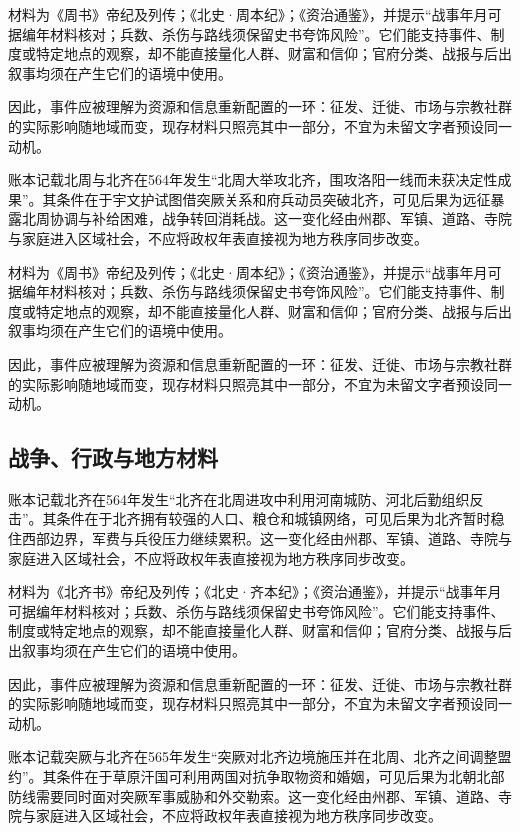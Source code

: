 材料为《周书》帝纪及列传；《北史·周本纪》；《资治通鉴》，并提示“战事年月可据编年材料核对；兵数、杀伤与路线须保留史书夸饰风险”。它们能支持事件、制度或特定地点的观察，却不能直接量化人群、财富和信仰；官府分类、战报与后出叙事均须在产生它们的语境中使用。

因此，事件应被理解为资源和信息重新配置的一环：征发、迁徙、市场与宗教社群的实际影响随地域而变，现存材料只照亮其中一部分，不宜为未留文字者预设同一动机。

账本记载北周与北齐在564年发生“北周大举攻北齐，围攻洛阳一线而未获决定性成果”。其条件在于宇文护试图借突厥关系和府兵动员突破北齐，可见后果为远征暴露北周协调与补给困难，战争转回消耗战。这一变化经由州郡、军镇、道路、寺院与家庭进入区域社会，不应将政权年表直接视为地方秩序同步改变。

材料为《周书》帝纪及列传；《北史·周本纪》；《资治通鉴》，并提示“战事年月可据编年材料核对；兵数、杀伤与路线须保留史书夸饰风险”。它们能支持事件、制度或特定地点的观察，却不能直接量化人群、财富和信仰；官府分类、战报与后出叙事均须在产生它们的语境中使用。

因此，事件应被理解为资源和信息重新配置的一环：征发、迁徙、市场与宗教社群的实际影响随地域而变，现存材料只照亮其中一部分，不宜为未留文字者预设同一动机。

\subsection{战争、行政与地方材料}

账本记载北齐在564年发生“北齐在北周进攻中利用河南城防、河北后勤组织反击”。其条件在于北齐拥有较强的人口、粮仓和城镇网络，可见后果为北齐暂时稳住西部边界，军费与兵役压力继续累积。这一变化经由州郡、军镇、道路、寺院与家庭进入区域社会，不应将政权年表直接视为地方秩序同步改变。

材料为《北齐书》帝纪及列传；《北史·齐本纪》；《资治通鉴》，并提示“战事年月可据编年材料核对；兵数、杀伤与路线须保留史书夸饰风险”。它们能支持事件、制度或特定地点的观察，却不能直接量化人群、财富和信仰；官府分类、战报与后出叙事均须在产生它们的语境中使用。

因此，事件应被理解为资源和信息重新配置的一环：征发、迁徙、市场与宗教社群的实际影响随地域而变，现存材料只照亮其中一部分，不宜为未留文字者预设同一动机。

账本记载突厥与北齐在565年发生“突厥对北齐边境施压并在北周、北齐之间调整盟约”。其条件在于草原汗国可利用两国对抗争取物资和婚姻，可见后果为北朝北部防线需要同时面对突厥军事威胁和外交勒索。这一变化经由州郡、军镇、道路、寺院与家庭进入区域社会，不应将政权年表直接视为地方秩序同步改变。

